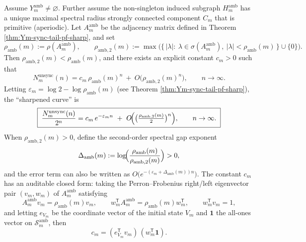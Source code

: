 \begin{theorem}\label{thm:Ym-unsync-prefix-pf-sharp}
Assume \(Y_m^{\mathrm{amb}}\neq\varnothing\).
Further assume the non-singleton induced subgraph \(H_m^{\mathrm{amb}}\) has a unique maximal spectral radius strongly connected component \(C_m\) that is primitive (aperiodic).
Let \(A_m^{\mathrm{amb}}\) be the adjacency matrix defined in Theorem \ref{thm:Ym-sync-tail-pf-sharp}, and set
\[
\rho_{\mathrm{amb}}(m):=\rho(A_m^{\mathrm{amb}}),\qquad
\rho_{\mathrm{amb},2}(m):=\max\bigl(\{\,|\lambda|:\ \lambda\in\sigma(A_m^{\mathrm{amb}}),\ |\lambda|<\rho_{\mathrm{amb}}(m)\,\}\cup\{0\}\bigr).
\]
Then \(\rho_{\mathrm{amb},2}(m)<\rho_{\mathrm{amb}}(m)\), and there exists an explicit constant \(c_m>0\) such that
\[
\boxed{\;
N_m^{\mathrm{unsync}}(n)
=c_m\,\rho_{\mathrm{amb}}(m)^{n}\ +\ O\!\bigl(\rho_{\mathrm{amb},2}(m)^{n}\bigr),
\qquad n\to\infty.\;}
\]
Letting \(\varepsilon_m=\log 2-\log\rho_{\mathrm{amb}}(m)\) (see Theorem \ref{thm:Ym-sync-tail-pf-sharp}), the ``sharpened curve'' is
\[
\boxed{\;
\frac{N_m^{\mathrm{unsync}}(n)}{2^n}
=c_m\,e^{-\varepsilon_m n}\ +\ O\!\Bigl(\bigl(\tfrac{\rho_{\mathrm{amb},2}(m)}{2}\bigr)^{n}\Bigr),
\qquad n\to\infty.\;}
\]
When \(\rho_{\mathrm{amb},2}(m)>0\), define the second-order spectral gap exponent
\[
\Delta_{\mathrm{amb}}(m):=\log\!\Bigl(\frac{\rho_{\mathrm{amb}}(m)}{\rho_{\mathrm{amb},2}(m)}\Bigr)>0,
\]
and the error term can also be written as \(O\!\bigl(e^{-(\varepsilon_m+\Delta_{\mathrm{amb}}(m))n}\bigr)\).
The constant \(c_m\) has an auditable closed form: taking the Perron--Frobenius right/left eigenvector pair \((v_m,w_m)\) of \(A_m^{\mathrm{amb}}\) satisfying
\[
A_m^{\mathrm{amb}}v_m=\rho_{\mathrm{amb}}(m)v_m,\qquad
w_m^{\mathsf T}A_m^{\mathrm{amb}}=\rho_{\mathrm{amb}}(m)w_m^{\mathsf T},\qquad
w_m^{\mathsf T}v_m=1,
\]
and letting \(e_{V_m}\) be the coordinate vector of the initial state \(V_m\) and \(\mathbf 1\) the all-ones vector on \(\mathcal{S}_m^{\mathrm{amb}}\), then
\[
\boxed{\;
c_m=(e_{V_m}^{\mathsf T}v_m)\,(w_m^{\mathsf T}\mathbf 1).\;}
\]
\end{theorem}

